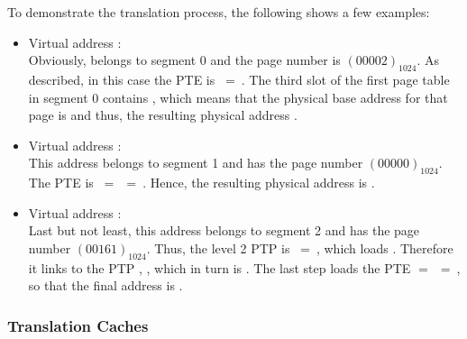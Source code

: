 To demonstrate the translation process, the following shows a few examples:
\begin{itemize}
	\item Virtual address :\\
	Obviously,  belongs to segment 0 and the page number is $(00002)_{1024}$. As described, in this case the PTE is $~=~$. The third slot of the first page table in segment 0 contains , which means that the physical base address for that page is  and thus, the resulting physical address .
	\item Virtual address :\\
	This address belongs to segment 1 and has the page number $(00000)_{1024}$. The PTE is $~=~$$~=~$. Hence, the resulting physical address is .
	\item Virtual address :\\
	Last but not least, this address belongs to segment 2 and has the page number $(00161)_{1024}$. Thus, the level 2 PTP is $~=~$, which loads . Therefore it links to the PTP , \ie {}, which in turn is . The last step loads the PTE  $=~$$~=~$, so that the final address is .
\end{itemize}

\subsubsection{Translation Caches}

